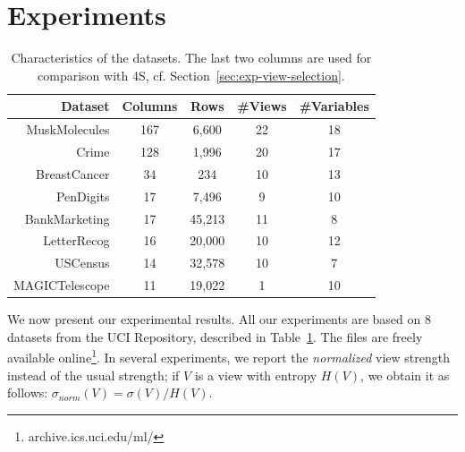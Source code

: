 \section{Experiments}
\label{sec:experiments}
\begin{table}
    \centering
    \small
    \begin{tabular}{r c c c c} 
        \hline
        Dataset & Columns & Rows & \#Views & \#Variables\\
        \hline
        MuskMolecules & 167 & 6,600 & 22 & 18\\
        Crime & 128 & 1,996 & 20 & 17\\
        BreastCancer & 34 & 234 & 10 & 13\\
        PenDigits & 17 & 7,496 & 9 & 10\\
        BankMarketing & 17 & 45,213 & 11& 8\\
        LetterRecog & 16 & 20,000 & 10 & 12\\
        USCensus & 14 & 32,578 & 10 & 7\\
        MAGICTelescope & 11 & 19,022 & 1 & 10\\
        \hline
    \end{tabular}
    \caption{Characteristics of the datasets. The last two columns are used for
    comparison with 4S, cf. Section~\ref{sec:exp-view-selection}.}
    \label{tab:datasets}
\end{table}
We now present our experimental results. All our experiments are based on 8
datasets from the UCI Repository, described in Table~\ref{tab:datasets}. The
files are freely available online\footnote{archive.ics.uci.edu/ml/}. In several
experiments, we report the \emph{normalized} view strength instead of the usual
strength; if $V$ is a view with entropy $H(V)$, we obtain it as follows:
$\sigma_{norm}(V) = \sigma(V) / H(V)$.

